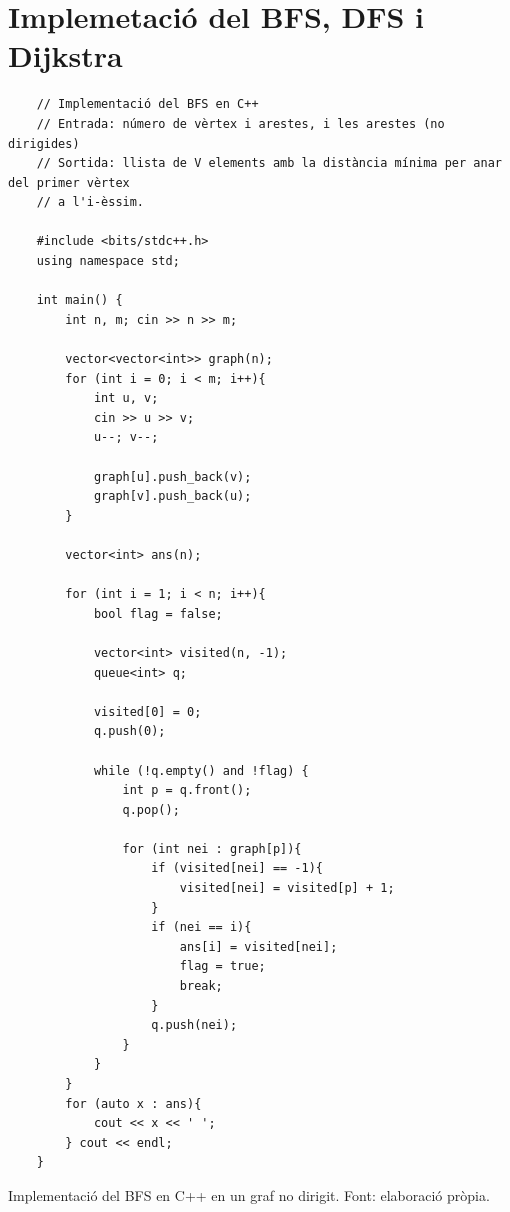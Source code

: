 \section{Implemetació del BFS, DFS i Dijkstra}
\begin{longlisting}
    \begin{verbatim}
    // Implementació del BFS en C++
    // Entrada: número de vèrtex i arestes, i les arestes (no dirigides)
    // Sortida: llista de V elements amb la distància mínima per anar del primer vèrtex 
    // a l'i-èssim.
    
    #include <bits/stdc++.h>
    using namespace std;
    
    int main() {
        int n, m; cin >> n >> m;
    
        vector<vector<int>> graph(n);
        for (int i = 0; i < m; i++){
            int u, v;
            cin >> u >> v;
            u--; v--;
    
            graph[u].push_back(v);
            graph[v].push_back(u);
        }
    
        vector<int> ans(n);
    
        for (int i = 1; i < n; i++){
            bool flag = false;
    
            vector<int> visited(n, -1);
            queue<int> q;
    
            visited[0] = 0;
            q.push(0);
    
            while (!q.empty() and !flag) {
                int p = q.front();
                q.pop();
    
                for (int nei : graph[p]){
                    if (visited[nei] == -1){
                        visited[nei] = visited[p] + 1;
                    }
                    if (nei == i){
                        ans[i] = visited[nei];
                        flag = true;
                        break;
                    }
                    q.push(nei);
                }
            }
        }
        for (auto x : ans){
            cout << x << ' ';
        } cout << endl;
    }
    \end{verbatim}
    \caption[Implementació del BFS en C++ en un graf no dirigit.]{Implementació del BFS en C++ en un graf no dirigit. Font: elaboració pròpia.}
    \label{Figura}
\end{longlisting}%

